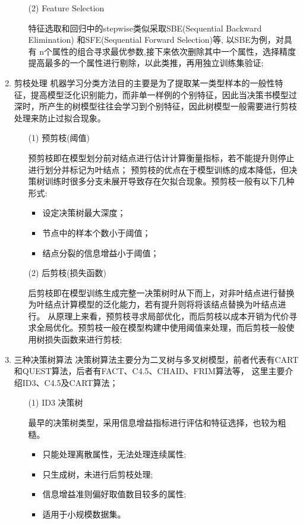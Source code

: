 \documentclass[a4paper]{article}
\begin{document}
\begin{enumerate}
\begin{itemize}
\begin{itemize}
						\end{itemize}

					\item[(2)] Feature Selection\par
						特征选取和回归中的stepwise类似采取SBE(Sequential Backward Elimination) 和SFE(Sequential Forward Selection)等, 以SBE为例，对具有
						n个属性的组合寻求最优参数,接下来依次删除其中一个属性，选择精度提高最多的一个属性进行剔除，以此类推，再用独立训练集验证;

				\end{itemize}


		\item 剪枝处理
			机器学习分类方法目的主要是为了提取某一类型样本的一般性特征，提高模型泛化识别能力，而非单一样例的个别特征，因此当决策书模型过深时，所产生的树模型往往会学习到个别特征，因此树模型一般需要进行剪枝处理来防止过拟合现象。
			\begin{itemize}
				\item[(1)] 预剪枝(阈值)\par
					预剪枝即在模型划分前对结点进行估计计算衡量指标，若不能提升则停止进行划分并标记为叶结点；
					预剪枝的优点在于模型训练的成本降低，但决策树训练时很多分支未展开导致存在欠拟合现象。预剪枝一般有以下几种形式:
						\begin{itemize}
							\item 设定决策树最大深度；
							\item 节点中的样本个数小于阈值；
							\item 结点分裂的信息增益小于阈值；
						\end{itemize}

				\item[(2)] 后剪枝(损失函数)\par
					后剪枝即在模型训练生成完整一决策树时从下而上，对非叶结点进行替换为叶结点计算模型的泛化能力，若有提升则将将该结点替换为叶结点进行。
				从原理上来看，预剪枝寻求局部优化，而后剪枝以成本开销为代价寻求全局优化。预剪枝一般在模型构建中使用阈值来处理，而后剪枝一般使用树损失函数来进行剪枝;
							
			\end{itemize}

		\item 三种决策树算法
			决策树算法主要分为二叉树与多叉树模型，前者代表有CART和QUEST算法，后者有FACT、C4.5、CHAID、FRIM算法等， 这里主要介绍ID3、C4.5及CART算法；
			\begin{itemize}

				\item[(1)] ID3 决策树\par
					最早的决策树类型，采用信息增益指标进行评估和特征选择，也较为粗糙。
					\begin{itemize}
						\item 只能处理离散属性，无法处理连续属性;
						\item 只生成树，未进行后剪枝处理;
						\item 信息增益准则偏好取值数目较多的属性;
						\item 适用于小规模数据集。
					\end{itemize}


\end{itemize}
\end{enumerate}
\end{document}
